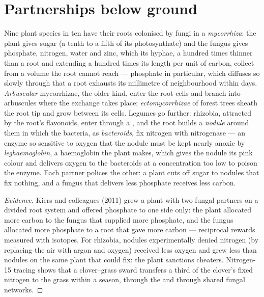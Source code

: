 \section{Partnerships below ground}

\begin{proposition}\label{prop:b2:living-soil:symbiosis}
Nine plant species in ten have their roots colonised by fungi in a
\emph{mycorrhiza}: the plant gives sugar (a tenth to a fifth of its
photosynthate) and the fungus gives phosphate, nitrogen, water and
zinc, which its hyphae, a hundred times thinner than a root and
extending a hundred times its length per unit of carbon, collect
from a  volume the root cannot reach --- phosphate in
particular, which diffuses so slowly through  that a root
exhausts its millimetre of neighbourhood within days.
\emph{Arbuscular} mycorrhizae, the older kind, enter the root cells
and branch into arbuscules where the exchange takes place;
\emph{ectomycorrhizae} of forest trees sheath the root tip and
grow between its cells. Legumes go further: rhizobia, attracted by
the root's flavonoids, enter through a , and the root
builds a \emph{nodule} around them in which the bacteria, as
\emph{bacteroids}, fix nitrogen with nitrogenase --- an enzyme so
sensitive to oxygen that the nodule must be kept nearly anoxic by
\emph{leghaemoglobin}, a haemoglobin the plant makes, which gives
the nodule its pink colour and delivers oxygen to the bacteroids
at a concentration too low to poison the enzyme. Each partner
polices the other: a plant cuts off sugar to nodules that fix
nothing, and a fungus that delivers less phosphate receives less
carbon.
\end{proposition}
\begin{proof}[Evidence]
Kiers and colleagues (2011) grew a plant with two fungal partners
on a divided root system and offered phosphate to one side only:
the plant allocated more carbon to the fungus that supplied more
phosphate, and the fungus allocated more phosphate to a root that
gave more carbon --- reciprocal rewards measured with isotopes.
For rhizobia, nodules experimentally denied nitrogen (by
replacing the air with argon and oxygen) received less oxygen and
grew less than nodules on the same plant that could fix: the plant
sanctions cheaters. Nitrogen-15 tracing shows that a clover--grass
sward transfers a third of the clover's fixed nitrogen to the
grass within a season, through the  and through shared fungal
networks.
\end{proof}

